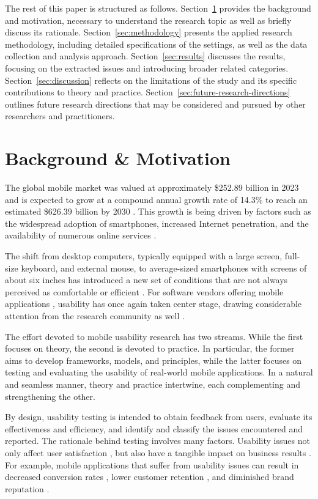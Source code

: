\documentclass[preprint,12pt,number]{elsarticle}
\begin{document}
The rest of this paper is structured as follows. 
Section~\ref{sec:background} provides the background and motivation, necessary to understand the research topic as well as briefly discuss its rationale. 
Section~\ref{sec:methodology} presents the applied research methodology, including detailed specifications of the settings, as well as the data collection and analysis approach. 
Section~\ref{sec:results} discusses the results, focusing on the extracted issues and introducing broader related categories.
Section~\ref{sec:discussion} reflects on the limitations of the study and its specific contributions to theory and practice. 
Section~\ref{sec:future-research-directions} outlines future research directions that may be considered and pursued by other researchers and practitioners. 


\section{Background \& Motivation}
\label{sec:background}
The global mobile market was valued at approximately \$252.89 billion in 2023 and is expected to grow at a compound annual growth rate of 14.3\% to reach an estimated \$626.39 billion by 2030 \citep{GVR2025}. This growth is being driven by factors such as the widespread adoption of smartphones, increased Internet penetration, and the availability of numerous online services \citep{Natanson2021}. 

The shift from desktop computers, typically equipped with a large screen, full-size keyboard, and external mouse, to average-sized smartphones with screens of about six inches has introduced a new set of conditions that are not always perceived as comfortable or efficient \citep{gafni2009usability}. For software vendors offering mobile applications \citep{Griffiths2015}, usability has once again taken center stage, drawing considerable attention from the research community as well \citep{nayebi2012state}. 

The effort devoted to mobile usability research has two streams. While the first focuses on theory, the second is devoted to practice. In particular, the former aims to develop frameworks, models, and principles, while the latter focuses on testing and evaluating the usability of real-world mobile applications. In a natural and seamless manner, theory and practice intertwine, each complementing and strengthening the other. 

By design, usability testing is intended to obtain feedback from users, evaluate its effectiveness and efficiency, and identify and classify the issues encountered and reported. The rationale behind testing involves many factors.
Usability issues not only affect user satisfaction \citep{ferreira2020impact}, but also have a tangible impact on business results \citep{konradt2012role}. For example, mobile applications that suffer from usability issues can result in decreased conversion rates \citep{daoud2023mobile}, lower customer retention \citep{wahab2011influence}, and diminished brand reputation \citep{casalo2007role}.
\end{document}
